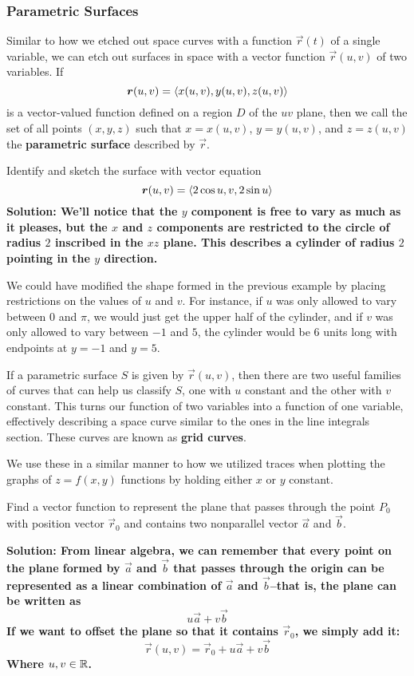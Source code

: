 \subsubsection{Parametric Surfaces}
Similar to how we etched out space curves with a function $\vec r(t)$ of a single variable, we can etch out surfaces in space with a vector function $\vec r(u,v)$ of two variables. If 
\[ \boldsymbol{r}(u,v) = \left\langle x(u,v), y(u,v), z(u,v)\right\rangle\]
is a vector-valued function defined on a region $D$ of the $uv$ plane, then we call the set of all points $(x,y,z)$ such that $x=x(u,v)$, $y=y(u,v)$, and $z=z(u,v)$ the \textbf{parametric surface} described by $\vec r$.
\begin{example}
    Identify and sketch the surface with vector equation
    \[ \boldsymbol{r}(u,v) = \left\langle 2\cos u, v, 2\sin u\right\rangle \]
    \bf{Solution: }We'll notice that the $y$ component is free to vary as much as it pleases, but the $x$ and $z$ components are restricted to the circle of radius $2$ inscribed in the $xz$ plane. This describes a cylinder of radius $2$ pointing in the $y$ direction.
\end{example}
We could have modified the shape formed in the previous example by placing restrictions on the values of $u$ and $v$. For instance, if $u$ was only allowed to vary between $0$ and $\pi$, we would just get the upper half of the cylinder, and if $v$ was only allowed to vary between $-1$ and $5$, the cylinder would be $6$ units long with endpoints at $y=-1$ and $y=5$. \par
If a parametric surface $S$ is given by $\vec r(u,v)$, then there are two useful families of curves that can help us classify $S$, one with $u$ constant and the other with $v$ constant. This turns our function of two variables into a function of one variable, effectively describing a space curve similar to the ones in the line integrals section. These curves are known as \textbf{grid curves}. \par 
We use these in a similar manner to how we utilized traces when plotting the graphs of $z=f(x,y)$ functions by holding either $x$ or $y$ constant.
\begin{example}
    Find a vector function to represent the plane that passes through the point $P_0$ with position vector $\vec r_0$ and contains two nonparallel vector $\vec a$ and $\vec b$. \par
    \bf{Solution:} From linear algebra, we can remember that every point on the plane formed by $\vec a$ and $\vec b$  that passes through the origin can be represented as a linear combination of $\vec a$ and $\vec b$--that is, the plane can be written as 
    \[ u\vec a + v\vec b\]
    If we want to offset the plane so that it contains $\vec r_0$, we simply add it:
    \[ \vec r(u,v) = \vec r_0 + u\vec a + v\vec b \]
    Where $u,v\in\mathbb{R}$.
\end{example}
